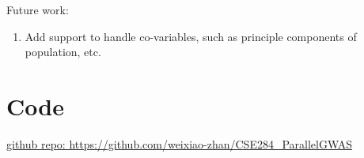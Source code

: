 \documentclass{article}
\begin{document}
Future work: 
\begin{enumerate}
\item Add support to handle co-variables, such as 
principle components of population, etc.
\end{enumerate}

\section{Code}
\href{https://github.com/weixiao-zhan/CSE284_ParallelGWAS}
{github repo: https://github.com/weixiao-zhan/CSE284\_ParallelGWAS}



\end{document}
